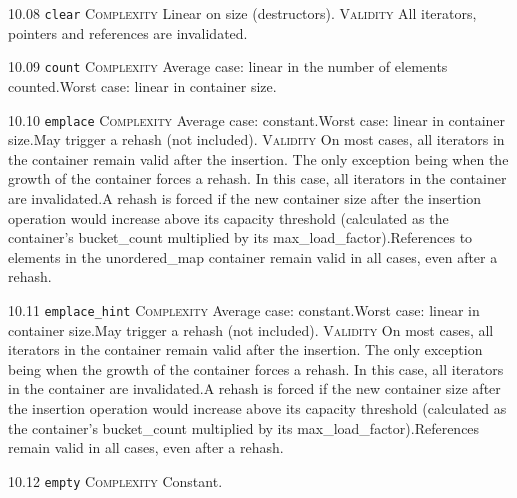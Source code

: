 \noindent\textcolor{corange}{10.08 \texttt{clear}} \textsc{Complexity} Linear on size (destructors). \textsc{Validity} All iterators, pointers and references are invalidated.\vspace{0.5em}

\noindent\textcolor{corange}{10.09 \texttt{count}} \textsc{Complexity} Average case: linear in the number of elements counted.Worst case: linear in container size. \vspace{0.5em}

\noindent\textcolor{corange}{10.10 \texttt{emplace}} \textsc{Complexity} Average case: constant.Worst case: linear in container size.May trigger a rehash (not included). \textsc{Validity} On most cases, all iterators in the container remain valid after the insertion. The only exception being when the growth of the container forces a rehash. In this case, all iterators in the container are invalidated.A rehash is forced if the new container size after the insertion operation would increase above its capacity threshold (calculated as the container's bucket\_count multiplied by its max\_load\_factor).References to elements in the unordered\_map container remain valid in all cases, even after a rehash.\vspace{0.5em}

\noindent\textcolor{corange}{10.11 \texttt{emplace\_hint}} \textsc{Complexity} Average case: constant.Worst case: linear in container size.May trigger a rehash (not included). \textsc{Validity} On most cases, all iterators in the container remain valid after the insertion. The only exception being when the growth of the container forces a rehash. In this case, all iterators in the container are invalidated.A rehash is forced if the new container size after the insertion operation would increase above its capacity threshold (calculated as the container's bucket\_count multiplied by its max\_load\_factor).References remain valid in all cases, even after a rehash.\vspace{0.5em}

\noindent\textcolor{cgreen}{10.12 \texttt{empty}} \textsc{Complexity} Constant. \vspace{0.5em}

